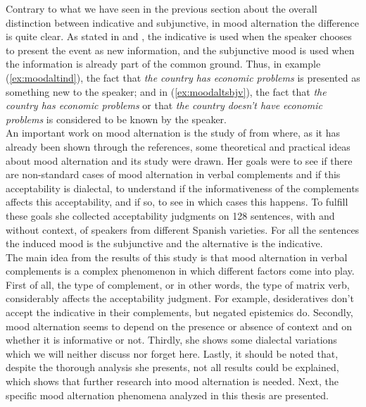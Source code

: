 Contrary to what we have seen in the previous section about the overall distinction between indicative and subjunctive, in mood alternation the difference is quite clear. As stated in \citet{mejias1998pragmatic,espanola2010nueva} and \citet{falk2017towards}, the indicative is used when the speaker chooses to present the event as new information, and the subjunctive mood is used when the information is already part of the common ground. Thus, in example (\ref{ex:moodaltind}), the fact that \textit{the country has economic problems} is presented as something new to the speaker; and in (\ref{ex:moodaltsbjv}), the fact that \textit{the country has economic problems} or that \textit{the country doesn't have economic problems} is considered to be known by the speaker.\\

An important work on mood alternation is the study of \citet{faulkner2021systematic} from where, as it has already been shown through the references, some theoretical and practical ideas about mood alternation and its study were drawn. Her goals were to see if there are non-standard cases of mood alternation in verbal complements and if this acceptability is dialectal, to understand if the informativeness of the complements affects this acceptability, and if so, to see in which cases this happens. To fulfill these goals she collected acceptability judgments on 128 sentences, with and without context, of speakers from different Spanish varieties. For all the sentences the induced mood is the subjunctive and the alternative is the indicative.\\

The main idea from the results of this study is that mood alternation in verbal complements is a complex phenomenon in which different factors come into play. First of all, the type of complement, or in other words, the type of matrix verb, considerably affects the acceptability judgment. For example, desideratives don't accept the indicative in their complements, but negated epistemics do. Secondly, mood alternation seems to depend on the presence or absence of context and on whether it is informative or not. Thirdly, she shows some dialectal variations which we will neither discuss nor forget here. Lastly, it should be noted that, despite the thorough analysis she presents, not all results could be explained, which shows that further research into mood alternation is needed. Next, the specific mood alternation phenomena analyzed in this thesis are presented.\\

